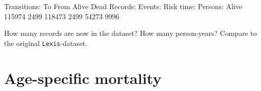 \documentclass[
]{book}
\newenvironment{Shaded}{\begin{snugshade}}{\end{snugshade}}
\newcommand{\NormalTok}[1]{#1}
\begin{document}
\begin{enumerate}
\begin{Shaded}
\begin{Highlighting}[]

\NormalTok{Transitions:}
\NormalTok{     To}
\NormalTok{From     Alive Dead Records: Events: Risk time: Persons:}
\NormalTok{  Alive 115974 2499   118473    2499      54273     9996}
\end{Highlighting}
\end{Shaded}

  How many records are now in the dataset? How many person-years?
  Compare to the original \texttt{Lexis}-dataset.
\end{enumerate}

\section{Age-specific mortality}\label{age-specific-mortality}
\end{document}
